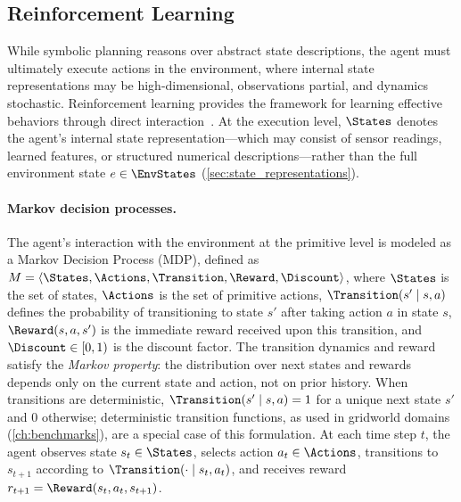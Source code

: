 \subsection{Reinforcement Learning}
\label{sec:rl}

While symbolic planning reasons over abstract state descriptions, the agent must ultimately execute actions in the environment, where internal state representations may be high-dimensional, observations partial, and dynamics stochastic. Reinforcement learning provides the framework for learning effective behaviors through direct interaction~\citep{sutton2018reinforcement}. At the execution level, $\States$ denotes the agent's internal state representation---which may consist of sensor readings, learned features, or structured numerical descriptions---rather than the full environment state $e \in \EnvStates$ (\cref{sec:state_representations}).

\paragraph{Markov decision processes.}
The agent's interaction with the environment at the primitive level is modeled as a Markov Decision Process (MDP), defined as $M = \langle \States, \Actions, \Transition, \Reward, \Discount \rangle$, where $\States$ is the set of states, $\Actions$ is the set of primitive actions, $\Transition(s' \mid s, a)$ defines the probability of transitioning to state $s'$ after taking action $a$ in state $s$, $\Reward(s, a, s')$ is the immediate reward received upon this transition, and $\Discount \in [0, 1)$ is the discount factor. The transition dynamics and reward satisfy the \emph{Markov property}: the distribution over next states and rewards depends only on the current state and action, not on prior history. When transitions are deterministic, $\Transition(s' \mid s, a) = 1$ for a unique next state $s'$ and $0$ otherwise; deterministic transition functions, as used in gridworld domains (\cref{ch:benchmarks}), are a special case of this formulation. At each time step $t$, the agent observes state $s_t \in \States$, selects action $a_t \in \Actions$, transitions to $s_{t+1}$ according to $\Transition(\cdot \mid s_t, a_t)$, and receives reward $r_{t+1} = \Reward(s_t, a_t, s_{t+1})$.

